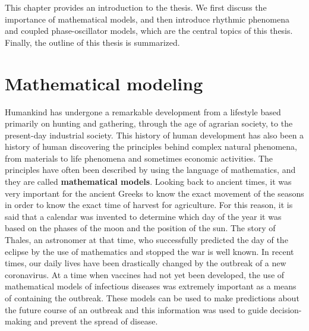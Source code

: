 This chapter provides an introduction to the thesis.
We first discuss the importance of mathematical models,
and then introduce rhythmic phenomena and coupled phase-oscillator models, which are the central topics of this thesis.
Finally, the outline of this thesis is summarized.

\section{Mathematical modeling}


Humankind has undergone a remarkable development from a lifestyle based primarily on hunting and gathering, through the age of agrarian society, to the present-day industrial society. This history of human development has also been a history of human discovering the principles behind complex natural phenomena, from materials to life phenomena and sometimes economic activities.
The principles have often been described by using the language of mathematics, and they are called \textbf{mathematical models}.
Looking back to ancient times, it was very important for the ancient Greeks to know the exact movement of the seasons in order to know the exact time of harvest for agriculture. For this reason, it is said that a calendar was invented to determine which day of the year it was based on the phases of the moon and the position of the sun. The story of Thales, an astronomer at that time, who successfully predicted the day of the eclipse by the use of mathematics and stopped the war is well known.
In recent times, our daily lives have been drastically changed by the outbreak of a new coronavirus. At a time when vaccines had not yet been developed, the use of mathematical models of infectious diseases was extremely important as a means of containing the outbreak. These models can be used to make predictions about the future course of an outbreak and this information was used to guide decision-making and prevent the spread of disease.

